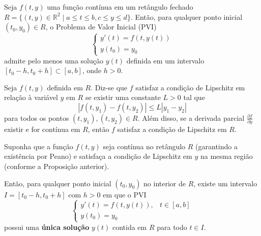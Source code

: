 \begin{teo}
    Seja $f(t, y)$ uma função contínua em um retângulo fechado $R = \{(t, y) \in \mathbb{R}^2 \mid a \leq t \leq b, c \leq y \leq d\}$. Então, para qualquer ponto inicial $(t_0, y_0) \in R$, o Problema de Valor Inicial (PVI)
    \begin{equation*}
        \begin{cases}
            y'(t) = f(t, y(t)) \\
            y(t_0) = y_0
        \end{cases}
    \end{equation*}
    admite pelo menos uma solução $y(t)$ definida em um intervalo $[t_0 - h, t_0 + h] \subset [a, b]$, onde $h > 0$.
\end{teo}

\begin{prop}
    Seja $f(t, y)$ definida em $R$. Diz-se que $f$ satisfaz a condição de Lipschitz em relação à variável $y$ em $R$ se existir uma constante $L > 0$ tal que
    \begin{equation*}
        |f(t, y_1) - f(t, y_2)| \leq L |y_1 - y_2|
    \end{equation*}
    para todos os pontos $(t, y_1), (t, y_2) \in R$. Além disso, se a derivada parcial $\frac{\partial f}{\partial y}$ existir e for contínua em $R$, então $f$ satisfaz a condição de Lipschitz em $R$.
\end{prop}

\begin{teo}
    Suponha que a função $f(t, y)$ seja contínua no retângulo $R$ (garantindo a existência por Peano) e satisfaça a condição de Lipschitz em $y$ na mesma região (conforme a Proposição anterior).

    Então, para qualquer ponto inicial $(t_0, y_0)$ no interior de $R$, existe um
    intervalo $I = [t_0 - h, t_0 + h]$ com $h > 0$ em que o PVI
    \begin{equation}
        \begin{cases}
            y'(t) = f(t, y(t)), & t \in [a, b] \\
            y(t_0) = y_0
        \end{cases}
    \end{equation}
    possui uma \textbf{única solução} $y(t)$ contida em $R$ para todo $t \in I$.
\end{teo}
